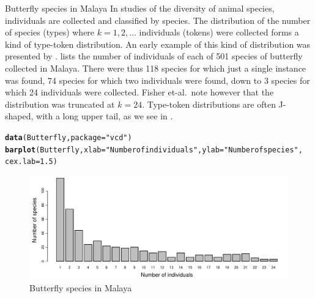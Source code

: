 \documentclass[11pt]{book}\usepackage[]{graphicx}\usepackage[]{color}
\makeatletter
\newcommand{\hlnum}[1]{\textcolor[rgb]{0.686,0.059,0.569}{#1}}%
\newcommand{\hlstr}[1]{\textcolor[rgb]{0.192,0.494,0.8}{#1}}%
\newcommand{\hlstd}[1]{\textcolor[rgb]{0.345,0.345,0.345}{#1}}%
\newcommand{\hlkwc}[1]{\textcolor[rgb]{0.333,0.667,0.333}{#1}}%
\newcommand{\hlkwd}[1]{\textcolor[rgb]{0.737,0.353,0.396}{\textbf{#1}}}%
\newenvironment{kframe}{%
 \def\at@end@of@kframe{}%
 \ifinner\ifhmode%
  \def\at@end@of@kframe{\end{minipage}}%
  \begin{minipage}{\columnwidth}%
 \fi\fi%
 \def\FrameCommand##1{\hskip\@totalleftmargin \hskip-\fboxsep
 \colorbox{shadecolor}{##1}\hskip-\fboxsep
     \hskip-\linewidth \hskip-\@totalleftmargin \hskip\columnwidth}%
 \MakeFramed {\advance\hsize-\width
   \@totalleftmargin\z@ \linewidth\hsize
   \@setminipage}}%
 {\par\unskip\endMakeFramed%
 \at@end@of@kframe}
\newenvironment{knitrout}{}{} %
\renewenvironment{knitrout}{\small\renewcommand{\baselinestretch}{.85}}{} %
\makeatother
\begin{document}
\begin{Example}[butterfly]{Butterfly species in Malaya}
In studies of the diversity of animal species, individuals are
collected and classified by species.
The distribution of the number of species (types) where $k = 1, 2, \dots$
individuals (tokens) were collected forms a kind of type-token distribution.
An early example of this kind of distribution was presented by
\citet{Fisher-etal:43}.
 lists the number of individuals of each of
501 species of butterfly collected in Malaya.
There were thus 118 species for which just a single instance was found,
74 species for which two individuals were found,
down to 3 species for which 24 individuals were collected.
Fisher et-al.\  note however that the distribution was truncated
at $k = 24$.
Type-token distributions are often J-shaped, with a long upper tail,
as we see in .


\begin{knitrout}
\color{fgcolor}\begin{kframe}
\begin{alltt}
\hlkwd{data}\hlstd{(Butterfly,} \hlkwc{package}\hlstd{=}\hlstr{"vcd"}\hlstd{)}
\hlkwd{barplot}\hlstd{(Butterfly,} \hlkwc{xlab}\hlstd{=}\hlstr{"Number of individuals"}\hlstd{,} \hlkwc{ylab}\hlstd{=}\hlstr{"Number of species"}\hlstd{,}
        \hlkwc{cex.lab}\hlstd{=}\hlnum{1.5}\hlstd{)}
\end{alltt}
\end{kframe}\begin{figure}[htbp]


\centerline{\includegraphics[width=.9\textwidth]{ch03/fig/butterfly} }

\caption[Butterfly species in Malaya]{Butterfly species in Malaya\label{fig:butterfly}}
\end{figure}


\end{knitrout}


\end{Example}
\end{document}
